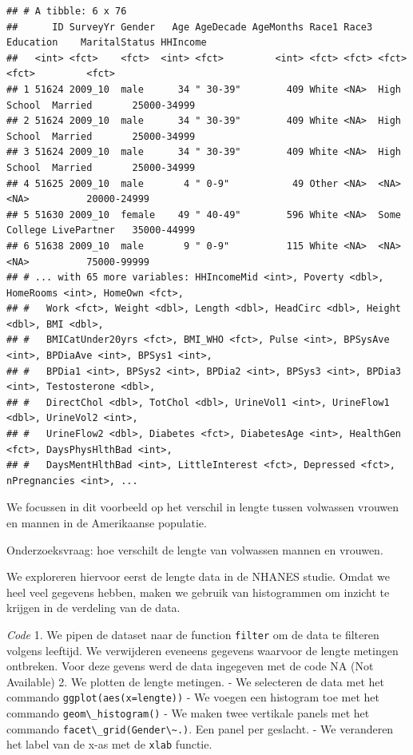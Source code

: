 \documentclass[
  12pt,dutch,coursenotes]{book}
\newcommand{\passthrough}[1]{#1}
\theoremstyle{definition}
\theoremstyle{definition}
\theoremstyle{definition}
\theoremstyle{definition}
\theoremstyle{remark}
\begin{document}
\begin{lstlisting}
## # A tibble: 6 x 76
##      ID SurveyYr Gender   Age AgeDecade AgeMonths Race1 Race3 Education    MaritalStatus HHIncome   
##   <int> <fct>    <fct>  <int> <fct>         <int> <fct> <fct> <fct>        <fct>         <fct>      
## 1 51624 2009_10  male      34 " 30-39"        409 White <NA>  High School  Married       25000-34999
## 2 51624 2009_10  male      34 " 30-39"        409 White <NA>  High School  Married       25000-34999
## 3 51624 2009_10  male      34 " 30-39"        409 White <NA>  High School  Married       25000-34999
## 4 51625 2009_10  male       4 " 0-9"           49 Other <NA>  <NA>         <NA>          20000-24999
## 5 51630 2009_10  female    49 " 40-49"        596 White <NA>  Some College LivePartner   35000-44999
## 6 51638 2009_10  male       9 " 0-9"          115 White <NA>  <NA>         <NA>          75000-99999
## # ... with 65 more variables: HHIncomeMid <int>, Poverty <dbl>, HomeRooms <int>, HomeOwn <fct>,
## #   Work <fct>, Weight <dbl>, Length <dbl>, HeadCirc <dbl>, Height <dbl>, BMI <dbl>,
## #   BMICatUnder20yrs <fct>, BMI_WHO <fct>, Pulse <int>, BPSysAve <int>, BPDiaAve <int>, BPSys1 <int>,
## #   BPDia1 <int>, BPSys2 <int>, BPDia2 <int>, BPSys3 <int>, BPDia3 <int>, Testosterone <dbl>,
## #   DirectChol <dbl>, TotChol <dbl>, UrineVol1 <int>, UrineFlow1 <dbl>, UrineVol2 <int>,
## #   UrineFlow2 <dbl>, Diabetes <fct>, DiabetesAge <int>, HealthGen <fct>, DaysPhysHlthBad <int>,
## #   DaysMentHlthBad <int>, LittleInterest <fct>, Depressed <fct>, nPregnancies <int>, ...
\end{lstlisting}

We focussen in dit voorbeeld op het verschil in lengte tussen volwassen vrouwen en mannen in de Amerikaanse populatie.

Onderzoeksvraag: hoe verschilt de lengte van volwassen mannen en vrouwen.

We exploreren hiervoor eerst de lengte data in de NHANES studie. Omdat we heel veel gegevens hebben, maken we gebruik van histogrammen om inzicht te krijgen in de verdeling van de data.

\emph{Code}
1. We pipen de dataset naar de function \passthrough{\lstinline!filter!} om de data te filteren volgens leeftijd. We verwijderen eveneens gegevens waarvoor de lengte metingen ontbreken. Voor deze gevens werd de data ingegeven met de code NA (Not Available)
2. We plotten de lengte metingen.
- We selecteren de data met het commando \passthrough{\lstinline!ggplot(aes(x=lengte))!}
- We voegen een histogram toe met het commando \passthrough{\lstinline!geom\_histogram()!}
- We maken twee vertikale panels met het commando \passthrough{\lstinline!facet\_grid(Gender\~.)!}. Een panel per geslacht.
- We veranderen het label van de x-as met de \passthrough{\lstinline!xlab!} functie.
\end{document}
